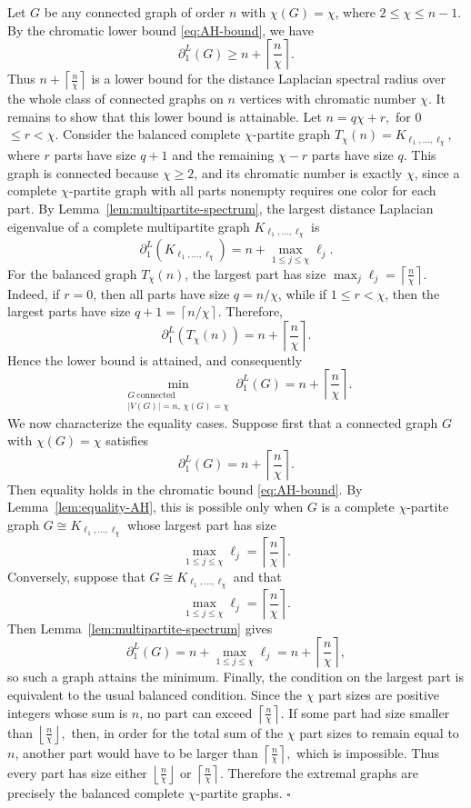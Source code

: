\documentclass[12pt]{article}
\newcommand{\ceil}[1]{\left\lceil #1 \right\rceil}
\newcommand{\floor}[1]{\left\lfloor #1 \right\rfloor}
\theoremstyle{plain}
\theoremstyle{definition}
\renewenvironment{proof}{{\noindent\bfseries Proof. }}{\hfill$\square$\par}
\begin{document}
\begin{proof}
	Let $G$ be any connected graph of order $n$ with $\chi(G)=\chi$, where
	$2\le \chi\le n-1$. By the chromatic lower bound \eqref{eq:AH-bound}, we have
	\[
	\partial_1^L(G)\ge n+\ceil{\frac{n}{\chi}}.
	\]
	Thus $n+\ceil{\tfrac{n}{\chi}}$ is a lower bound for the distance Laplacian spectral radius over the whole class of connected graphs on $n$ vertices with chromatic number $\chi$. It remains to show that this lower bound is attainable. Let  $n=q\chi+r,$ for 0$\le r<\chi.$  Consider the balanced complete $\chi$-partite graph $T_\chi(n)=K_{\ell_1,\dots,\ell_\chi},$ where $r$ parts have size $q+1$ and the remaining $\chi-r$ parts have size $q$. This graph is connected because $\chi\ge2$, and its chromatic number is exactly $\chi$, since a complete $\chi$-partite graph with all parts nonempty requires one color for each part.
	 By Lemma~\ref{lem:multipartite-spectrum}, the largest distance Laplacian eigenvalue of a complete multipartite graph
	$K_{\ell_1,\dots,\ell_\chi}$ is
	\[
	\partial_1^L(K_{\ell_1,\dots,\ell_\chi})=n+\max_{1\le j\le\chi}\ell_j.
	\]
	For the balanced graph $T_\chi(n)$, the largest part has size $\max_j\ell_j=
	\ceil{\tfrac{n}{\chi}}.$ 
	Indeed, if $r=0$, then all parts have size $q=n/\chi$, while if $1\le r<\chi$, then the largest parts have size $q+1=\ceil{n/\chi}$. Therefore,
	\[
	\partial_1^L(T_\chi(n))
	=
	n+\ceil{\frac{n}{\chi}}.
	\]
	Hence the lower bound is attained, and consequently
	\[
	\min_{\substack{G~\mathrm{connected}\\ |V(G)|=n,\,\chi(G)=\chi}}
	\partial_1^L(G)
	=
	n+\ceil{\frac{n}{\chi}}.
	\]
	 We now characterize the equality cases. Suppose first that a connected graph $G$ with $\chi(G)=\chi$ satisfies
	\[
	\partial_1^L(G)=n+\ceil{\frac{n}{\chi}}.
	\]
	Then equality holds in the chromatic bound \eqref{eq:AH-bound}. By Lemma~\ref{lem:equality-AH}, this is possible only when $G$ is a complete $\chi$-partite graph $G\cong K_{\ell_1,\dots,\ell_\chi}$ whose largest part has size
	\[
	\max_{1\le j\le\chi}\ell_j=\ceil{\frac{n}{\chi}}.
	\]
	 Conversely, suppose that $G\cong K_{\ell_1,\dots,\ell_\chi}$ and that
	\[
	\max_{1\le j\le\chi}\ell_j=\ceil{\frac{n}{\chi}}.
	\]
	Then Lemma~\ref{lem:multipartite-spectrum} gives
	\[
	\partial_1^L(G)
	=
	n+\max_{1\le j\le\chi}\ell_j
	=
	n+\ceil{\frac{n}{\chi}},
	\]
	so such a graph attains the minimum. Finally, the condition on the largest part is equivalent to the usual balanced condition. Since the $\chi$ part sizes are positive integers whose sum is $n$, no part can exceed
	 $\ceil{\tfrac{n}{\chi}}.$ If some part had size smaller than $\floor{\tfrac{n}{\chi}},$ then, in order for the total sum of the $\chi$ part sizes to remain equal to $n$, another part would have to be larger than
	 $\ceil{\tfrac{n}{\chi}},$ which is impossible. Thus every part has size either
	 $\floor{\frac{n}{\chi}}$ or $\ceil{\frac{n}{\chi}}.$ Therefore the extremal graphs are precisely the balanced complete $\chi$-partite graphs.
\end{proof}
\end{document}
